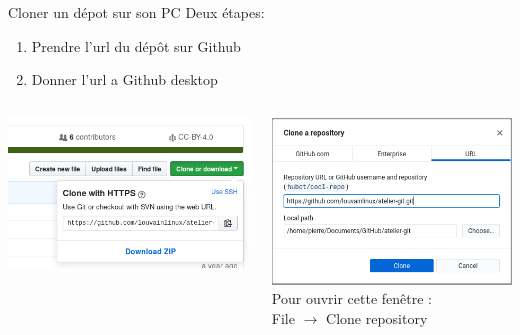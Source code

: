 \documentclass{beamer}
\begin{document}
\begin{frame}{Cloner un dépot sur son PC}
    Deux étapes:
    \begin{enumerate}
    \item Prendre l'url du dépôt sur Github
    \item Donner l'url a Github desktop
    \end{enumerate}
	\begin{columns}    
    	\begin{column}{0.5\textwidth}
    		\includegraphics[scale=0.35]{img/github_desktop/clone_repo.png}\\ $ $\\
		\end{column}
		\begin{column}{0.5\textwidth}
    		\includegraphics[scale=0.3]{img/github_desktop/clone_repo_desktop_2.png}\\
    		{\small Pour ouvrir cette fenêtre : \\File $\rightarrow$ Clone repository}
		\end{column}
	\end{columns}
\end{frame}
\end{document}
